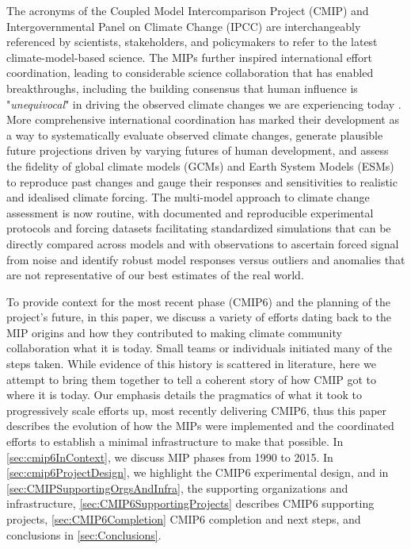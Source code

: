 \documentclass[gmd, preprint]{copernicus}
\begin{document}
The acronyms of the Coupled Model Intercomparison Project (CMIP) and Intergovernmental Panel on Climate Change (IPCC) are interchangeably referenced by scientists, stakeholders, and policymakers to refer to the latest climate-model-based science. The MIPs further inspired international effort coordination, leading to considerable science collaboration that has enabled breakthroughs, including the building consensus that human influence is "\textit{unequivocal}" in driving the observed climate changes we are experiencing today \citep{eyring_human_2021}. More comprehensive international coordination has marked their development as a way to systematically evaluate observed climate changes, generate plausible future projections driven by varying futures of human development, and assess the fidelity of global climate models (GCMs) and Earth System Models (ESMs) to reproduce past changes and gauge their responses and sensitivities to realistic and idealised climate forcing. The multi-model approach to climate change assessment is now routine, with documented and reproducible experimental protocols and forcing datasets facilitating standardized simulations that can be directly compared across models and with observations to ascertain forced signal from noise and identify robust model responses versus outliers and anomalies that are not representative of our best estimates of the real world.

To provide context for the most recent phase (CMIP6) and the planning of the project’s future, in this paper, we discuss a variety of efforts dating back to the MIP origins and how they contributed to making climate community collaboration what it is today. Small teams or individuals initiated many of the steps taken. While evidence of this history is scattered in literature, here we attempt to bring them together to tell a coherent story of how CMIP got to where it is today. Our emphasis details the pragmatics of what it took to progressively scale efforts up, most recently delivering CMIP6, thus this paper describes the evolution of how the MIPs were implemented and the coordinated efforts to establish a minimal infrastructure to make that possible. In \autoref{sec:cmip6InContext}, we discuss MIP phases from 1990 to 2015. In \autoref{sec:cmip6ProjectDesign}, we highlight the CMIP6 experimental design, and in \autoref{sec:CMIPSupportingOrgsAndInfra}, the supporting organizations and infrastructure, \autoref{sec:CMIP6SupportingProjects} describes CMIP6 supporting projects, \autoref{sec:CMIP6Completion} CMIP6 completion and next steps, and conclusions in \autoref{sec:Conclusions}.
\end{document}

